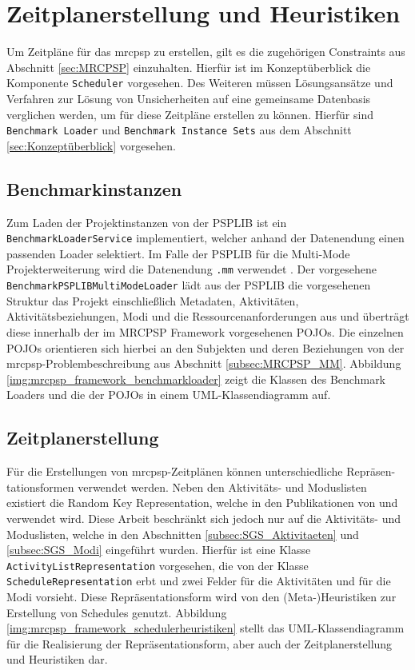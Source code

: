 \section{Zeitplanerstellung und Heuristiken} \label{sec:Heuristiken}

Um Zeitpläne für das \ac{mrcpsp} zu erstellen, gilt es die zugehörigen Constraints aus Abschnitt \ref{sec:MRCPSP} einzuhalten. Hierfür ist im Konzeptüberblick die Komponente \lstinline|Scheduler| vorgesehen. Des Weiteren müssen Lösungsansätze und Verfahren zur Lösung von Unsicherheiten auf eine gemeinsame Datenbasis verglichen werden, um für diese Zeitpläne erstellen zu können. Hierfür sind \lstinline|Benchmark Loader| und \lstinline|Benchmark Instance Sets| aus dem Abschnitt \ref{sec:Konzeptüberblick} vorgesehen. 

\subsection{Benchmarkinstanzen}

Zum Laden der Projektinstanzen von der PSPLIB ist ein \lstinline|BenchmarkLoaderService| implementiert, welcher anhand der Datenendung einen passenden Loader selektiert. Im Falle der PSPLIB für die Multi-Mode Projekterweiterung wird die Datenendung \lstinline|.mm| verwendet \cite[vgl.][S. 213 f.]{kolisch_psplib_1997}. Der vorgesehene \lstinline|BenchmarkPSPLIBMultiModeLoader| lädt aus der PSPLIB die vorgesehenen Struktur das Projekt einschließlich Metadaten, Aktivitäten, Aktivitätsbeziehungen, Modi und die Ressourcenanforderungen aus und überträgt diese innerhalb der im MRCPSP Framework vorgesehenen \acp{POJO}. Die einzelnen \acp{POJO} orientieren sich hierbei an den Subjekten und deren Beziehungen von der \ac{mrcpsp}-Problembeschreibung aus Abschnitt \ref{subsec:MRCPSP_MM}. Abbildung \ref{img:mrcpsp_framework_benchmarkloader} zeigt die Klassen des Benchmark Loaders und die der \acp{POJO} in einem UML-Klassendiagramm auf.

\subsection{Zeitplanerstellung}

Für die Erstellungen von \ac{mrcpsp}-Zeitplänen können unterschiedliche Repräsen-tationsformen verwendet werden. Neben den Aktivitäts- und Moduslisten existiert die Random Key Representation, welche in den Publikationen von \cite{sebt_efficient_2015} und \cite{kolisch_heuristic_1998} verwendet wird. Diese Arbeit beschränkt sich jedoch nur auf die Aktivitäts- und Moduslisten, welche in den Abschnitten \ref{subsec:SGS_Aktivitaeten} und \ref{subsec:SGS_Modi} eingeführt wurden. Hierfür ist eine Klasse \lstinline|ActivityListRepresentation| vorgesehen, die von der Klasse \lstinline|ScheduleRepresentation| erbt und zwei Felder für die Aktivitäten und für die Modi vorsieht. Diese Repräsentationsform wird von den (Meta-)Heuristiken zur Erstellung von Schedules genutzt. Abbildung \ref{img:mrcpsp_framework_schedulerheuristiken} stellt das UML-Klassendiagramm für die Realisierung der Repräsentationsform, aber auch der Zeitplanerstellung und Heuristiken dar. \\

